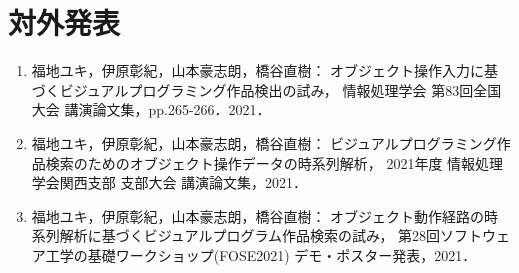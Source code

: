 \documentclass[11pt]{jreport}
\begin{document}
\chapter*{対外発表}
\begin{enumerate}
    \item 福地ユキ，伊原彰紀，山本豪志朗，橋谷直樹：
    オブジェクト操作入力に基づくビジュアルプログラミング作品検出の試み，
    情報処理学会 第83回全国大会 講演論文集，pp.265-266．2021．
    \item 福地ユキ，伊原彰紀，山本豪志朗，橋谷直樹：
    ビジュアルプログラミング作品検索のためのオブジェクト操作データの時系列解析，
    2021年度 情報処理学会関西支部 支部大会 講演論文集，2021．
    \item 福地ユキ，伊原彰紀，山本豪志朗，橋谷直樹：
    オブジェクト動作経路の時系列解析に基づくビジュアルプログラム作品検索の試み，
    第28回ソフトウェア工学の基礎ワークショップ(FOSE2021) デモ・ポスター発表，2021．
\end{enumerate}


% 
% 
% 

\end{document}
